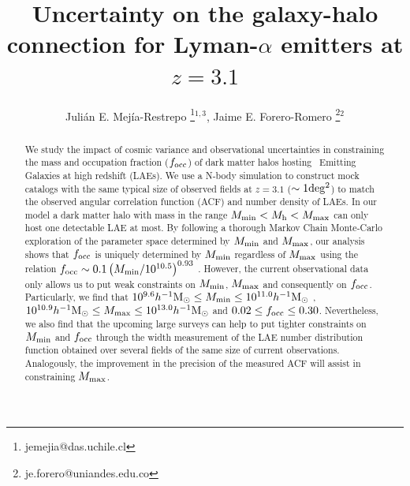 \documentclass{emulateapj}
\newcommand{\ly}{{\ifmmode{{\rm Ly}\alpha}\else{Ly$\alpha$}\fi}}
\newcommand{\hMsun}{{\ifmmode{h^{-1}{\rm {M_{\odot}}}}\else{$h^{-1}{\rm{M_{\odot}}}$}\fi}}
\newcommand{\mmin}{{\ifmmode{{M_{\rm min}}}\else{${M_{\rm min}}$}\fi}}
\newcommand{\focc}{{\ifmmode{{f_{\rm occ}}}\else{${f_{\rm occ}}$}\fi}}
\begin{document}
\title{Uncertainty on the galaxy-halo connection for Lyman-$\alpha$ emitters at $z=3.1$}
\author{
  Juli\'an E. Mej\'ia-Restrepo \thanks{jemejia@das.uchile.cl}$^{1,3}$,
  Jaime E. Forero-Romero \thanks{je.forero@uniandes.edu.co}$^{2}$ 
}






\begin{abstract}
We study the impact of cosmic variance and observational uncertainties in constraining the mass and  occupation fraction ($f_{\rm occ}$) of dark matter halos hosting \ly\ Emitting  Galaxies at high redshift (LAEs).
We use a N-body simulation to construct mock catalogs with the same typical size  of observed fields at $z=3.1$ ($\sim 1 {\rm deg^2}$) to match the observed  angular correlation function (ACF) and number density of LAEs.  
In our model a dark matter halo with mass in the range $M_{\rm min}<M_{\rm h}<M_{\rm   max}$ can only host one detectable LAE at most. By following a thorough Markov Chain Monte-Carlo exploration of the parameter space determined by $M_{\rm min}$ and $M_{\rm   max}$, our analysis shows that $f_{\rm occ}$ is uniquely determined by $M_{\rm min}$ regardless of $M_{\rm max}$ using the relation $\focc\sim0.1\left(\mmin/10^{10.5}\right)^{0.93}$ . 
However, the current observational data only allows us to put weak constraints on $M_{\rm min}$, $M_{\rm max}$ and consequently on $f_{\rm occ}$. 
Particularly, we find that $10^{9.6}\hMsun\leq M_{\rm min}\leq 10^{11.0}\hMsun$ , $10^{10.9}\hMsun\leq M_{\rm max}\leq 10^{13.0}\hMsun$ and $0.02\leq f_{\rm occ}\leq 0.30$. 
Nevertheless, we also find that  the upcoming large surveys can help to put tighter constraints on $M_{\rm min}$ and $f_{\rm occ}$ through the width measurement of the LAE number distribution function obtained over several fields of the same size of current observations. 
Analogously, the  improvement in the precision of the measured ACF will assist in constraining $M_{\rm max}$.  
\end{abstract}
\end{document}
